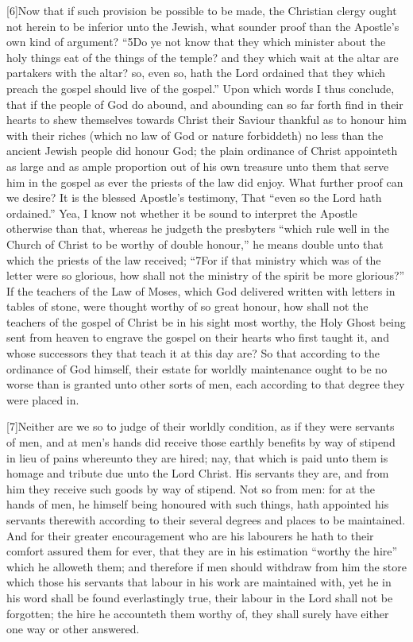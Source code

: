 [6]Now that if such provision be possible to be made, the Christian clergy ought not herein to be inferior unto the Jewish, what sounder proof than the Apostle’s own kind of argument? “5Do ye not know that they which minister about the holy things eat of the things of the temple? and they which wait at the altar are partakers with the altar? so, even so, hath the Lord ordained that they which preach the gospel should live of the gospel.” Upon which words I thus conclude, that if the people of God do abound, and abounding can so far forth find in their hearts to shew themselves towards Christ their Saviour thankful as to honour him with their riches (which no law of God or nature forbiddeth) no less than the ancient Jewish people did honour God; the plain ordinance of Christ appointeth as large and as ample proportion out of his own treasure unto them that serve him in the gospel as ever the priests of the law did enjoy. What further proof can we desire? It is the blessed Apostle’s testimony, That “even so the Lord hath ordained.” Yea, I know not whether it be sound to interpret the Apostle otherwise than that, whereas he judgeth the presbyters “which rule well in the Church of Christ to be worthy of double honour,” he means double unto that which the priests of the law received; “7For  if that ministry which was of the letter were so glorious, how shall not the ministry of the spirit be more glorious?” If the teachers of the Law of Moses, which God delivered written with letters in tables of stone, were thought worthy of so great honour, how shall not the teachers of the gospel of Christ be in his sight most worthy, the Holy Ghost being sent from heaven to engrave the gospel on their hearts who first taught it, and whose successors they that teach it at this day are? So that according to the ordinance of God himself, their estate for worldly maintenance ought to be no worse than is granted unto other sorts of men, each according to that degree they were placed in.

[7]Neither are we so to judge of their worldly condition, as if they were servants of men, and at men’s hands did receive those earthly benefits by way of stipend in lieu of pains whereunto they are hired; nay, that which is paid unto them is homage and tribute due unto the Lord Christ. His servants they are, and from him they receive such goods by way of stipend. Not so from men: for at the hands of men, he himself being honoured with such things, hath appointed his servants therewith according to their several degrees and places to be maintained. And for their greater encouragement who are his labourers he hath to their comfort assured them for ever, that they are in his estimation “worthy the hire” which he alloweth them; and therefore if men should withdraw from him the store which those his servants that labour in his work are maintained with, yet he in his word shall be found everlastingly true, their labour in the Lord shall not be forgotten; the hire he accounteth them worthy of, they shall surely have either one way or other answered.

